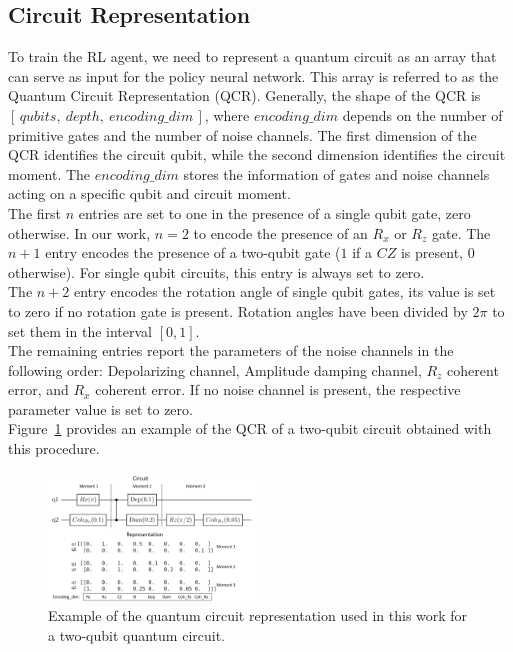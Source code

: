 \documentclass[sn-basic]{sn-jnl} %
\begin{document}

\subsection{Circuit Representation}
To train the RL agent, we need to represent a quantum circuit as an array that can serve as input for the policy neural network. 
This array is referred to as the Quantum Circuit Representation (QCR). 
Generally, the shape of the QCR is $[\,qubits,\: depth,\: encoding\_dim\,]$, where $encoding\_dim$ depends on the number of primitive gates 
and the number of noise channels. 
The first dimension of the QCR identifies the circuit qubit, while the second dimension identifies the circuit moment. 
The $encoding\_dim$ stores the information of gates and noise channels acting on a specific qubit and circuit moment.\\
The first $n$ entries are set to one in the presence of a single qubit gate, zero otherwise. 
In our work, $n=2$ to encode the presence of an $R_x$ or $R_z$ gate. The $n+1$ entry encodes the presence of a two-qubit gate 
($1$ if a $CZ$ is present, $0$ otherwise). For single qubit circuits, this entry is always set to zero. \\
The $n+2$ entry encodes the rotation angle of single qubit gates, its value is set to zero if no rotation gate is present. 
Rotation angles have been divided by $2\pi$ to set them in the interval $[0,1]$. \\
The remaining entries report the parameters of the noise channels in the following order: Depolarizing channel, Amplitude damping channel, $R_z$ coherent error, and $R_x$ coherent error. 
If no noise channel is present, the respective parameter value is set to zero. \\
Figure~\ref{fig_qcr} provides an example of the QCR of a two-qubit circuit obtained with this procedure.

\begin{figure}
    \centering
    \includegraphics[width=0.49\textwidth]{circuit_representation.png}
    \caption{Example of the quantum circuit representation used in this work for a two-qubit quantum circuit.}\label{fig_qcr}
\end{figure}
\end{document}
